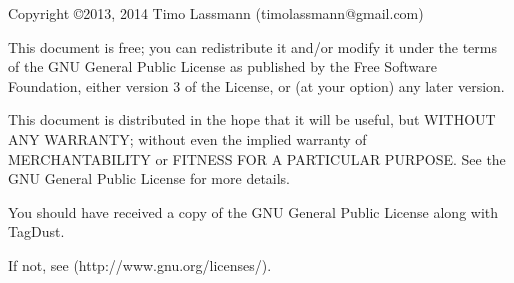 \documentclass[11pt,a4paper,oneside]{book}
\begin{document}
\frontmatter
\newlength{\centeroffset}
\thispagestyle{empty}
\noindent\hspace*{\centeroffset}

\noindent\hspace*{\centeroffset}



\pagebreak
\begin{small} 

Copyright \copyright  2013, 2014 Timo Lassmann (timolassmann@gmail.com)
 
 This document is free;  you can redistribute it and/or modify
 it under the terms of the GNU General Public License as published by
 the Free Software Foundation, either version 3 of the License, or
 (at your option) any later version.
 
 This document is distributed in the hope that it will be useful,
 but WITHOUT ANY WARRANTY; without even the implied warranty of
 MERCHANTABILITY or FITNESS FOR A PARTICULAR PURPOSE.  See the
 GNU General Public License for more details.
 
 You should have received a copy of the GNU General Public License
 along with TagDust.  
 
 If not, see (http://www.gnu.org/licenses/).



\end{small}
\end{document}
